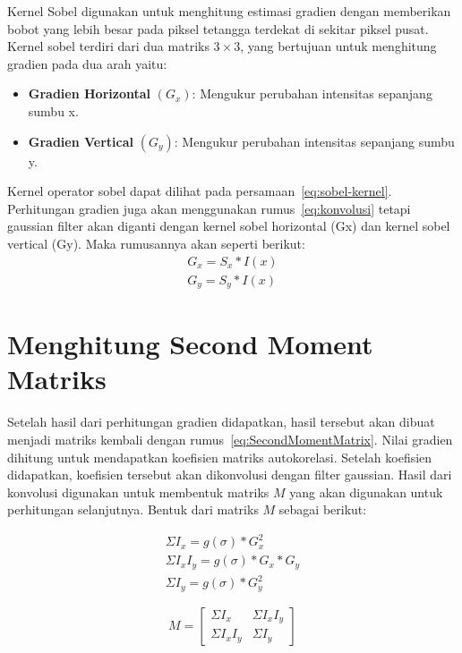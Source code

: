     Kernel Sobel digunakan untuk menghitung estimasi gradien dengan memberikan bobot yang lebih besar pada piksel tetangga terdekat di sekitar piksel pusat.
Kernel sobel terdiri dari dua matriks \(3 \times 3\), yang bertujuan untuk menghitung gradien pada dua arah yaitu:
 \begin{itemize}
    \item \textbf{Gradien Horizontal} \((G_{x})\): Mengukur perubahan intensitas sepanjang sumbu x.
    \item \textbf{Gradien Vertical} \((G_{y})\): Mengukur perubahan intensitas sepanjang sumbu y.
\end{itemize}Kernel operator sobel dapat dilihat pada persamaan~\eqref{eq:sobel-kernel}. 
Perhitungan gradien juga akan menggunakan rumus~\eqref{eq:konvolusi} tetapi gaussian filter akan diganti dengan kernel sobel horizontal (Gx) dan kernel sobel vertical (Gy).
Maka rumusannya akan seperti berikut:
\begin{equation}
    \begin{aligned}
        G_{x} = S_{x} * I(x)\\ G_{y} = S_{y} * I(x)
    \end{aligned}
\end{equation}


\section{Menghitung Second Moment Matriks}
    Setelah hasil dari perhitungan gradien didapatkan, hasil tersebut akan dibuat menjadi matriks kembali dengan rumus~\eqref{eq:SecondMomentMatrix}. Nilai gradien dihitung untuk mendapatkan koefisien matriks autokorelasi. Setelah koefisien didapatkan, koefisien tersebut akan dikonvolusi dengan filter gaussian.
Hasil dari konvolusi digunakan untuk membentuk matriks \(M\) yang akan digunakan untuk perhitungan selanjutnya. Bentuk dari matriks \(M\) sebagai berikut:

\begin{equation*}
    \begin{aligned}
        \Sigma I_{x} = g(\sigma) * G_{x}^2 \\
        \Sigma I_{x}I_{y} = g(\sigma) * G_{x} * G_{y} \\
        \Sigma I_{y} = g(\sigma) * G_{y}^2
    \end{aligned}
\end{equation*}

\begin{equation}
    M = 
    \begin{bmatrix}
        \Sigma I_{x} & \Sigma I_{x}I_{y} \\
        \Sigma I_{x}I_{y} & \Sigma I_{y}
    \end{bmatrix} 
\end{equation}

